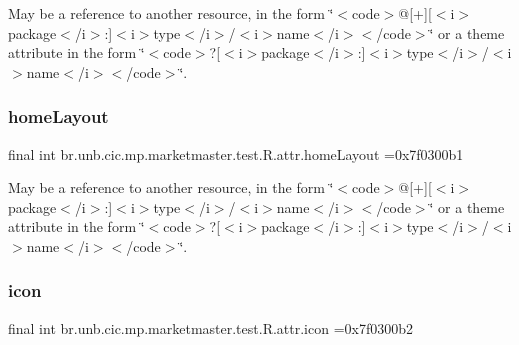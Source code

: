 May be a reference to another resource, in the form \char`\"{}$<$code$>$@\mbox{[}+\mbox{]}\mbox{[}$<$i$>$package$<$/i$>$\+:\mbox{]}$<$i$>$type$<$/i$>$/$<$i$>$name$<$/i$>$$<$/code$>$\char`\"{} or a theme attribute in the form \char`\"{}$<$code$>$?\mbox{[}$<$i$>$package$<$/i$>$\+:\mbox{]}$<$i$>$type$<$/i$>$/$<$i$>$name$<$/i$>$$<$/code$>$\char`\"{}. \mbox{\label{classbr_1_1unb_1_1cic_1_1mp_1_1marketmaster_1_1test_1_1R_1_1attr_acc379c3a491a7392092240708b8bf134}} 
\subsubsection{\texorpdfstring{home\+Layout}{homeLayout}}
{\footnotesize\ttfamily final int br.\+unb.\+cic.\+mp.\+marketmaster.\+test.\+R.\+attr.\+home\+Layout =0x7f0300b1\hspace{0.3cm}{\ttfamily [static]}}

May be a reference to another resource, in the form \char`\"{}$<$code$>$@\mbox{[}+\mbox{]}\mbox{[}$<$i$>$package$<$/i$>$\+:\mbox{]}$<$i$>$type$<$/i$>$/$<$i$>$name$<$/i$>$$<$/code$>$\char`\"{} or a theme attribute in the form \char`\"{}$<$code$>$?\mbox{[}$<$i$>$package$<$/i$>$\+:\mbox{]}$<$i$>$type$<$/i$>$/$<$i$>$name$<$/i$>$$<$/code$>$\char`\"{}. \mbox{\label{classbr_1_1unb_1_1cic_1_1mp_1_1marketmaster_1_1test_1_1R_1_1attr_aa683866790bebdb31d70b10243aea1d4}} 
\subsubsection{\texorpdfstring{icon}{icon}}
{\footnotesize\ttfamily final int br.\+unb.\+cic.\+mp.\+marketmaster.\+test.\+R.\+attr.\+icon =0x7f0300b2\hspace{0.3cm}{\ttfamily [static]}}

